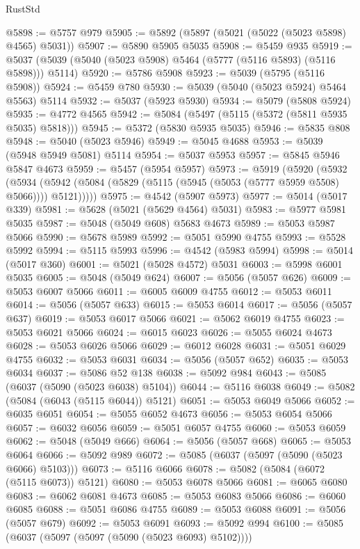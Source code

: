 \begin{lexlean}{RustStd}
\begin{coremodule}
@5898 := @5757 @979
@5905 := @5892 (@5897 (@5021 (@5022 (@5023 @5898) @4565) @5031))
@5907 := @5890 @5905 @5035
@5908 := @5459 @935
@5919 := @5037 (@5039 (@5040 (@5023 @5908) @5464 (@5777 (@5116 @5893) (@5116 @5898))) @5114)
@5920 := @5786 @5908
@5923 := @5039 (@5795 (@5116 @5908))
@5924 := @5459 @780
@5930 := @5039 (@5040 (@5023 @5924) @5464 @5563) @5114
@5932 := @5037 (@5923 @5930)
@5934 := @5079 (@5808 @5924)
@5935 := @4772 @4565
@5942 := @5084 (@5497 (@5115 (@5372 (@5811 @5935 @5035) @5818)))
@5945 := @5372 (@5830 @5935 @5035)
@5946 := @5835 @808
@5948 := @5040 (@5023 @5946)
@5949 := @5045 @4688
@5953 := @5039 (@5948 @5949 @5081) @5114
@5954 := @5037 @5953
@5957 := @5845 @5946 @5847 @4673
@5959 := @5457 (@5954 @5957)
@5973 := @5919
    (@5920
      (@5932
        (@5934 (@5942 (@5084 (@5829 (@5115 (@5945 (@5053 (@5777 @5959 @5508) @5066)))) @5121)))))
@5975 := @4542 (@5907 @5973)
@5977 := @5014 (@5017 @339)
@5981 := @5628 (@5021 (@5629 @4564) @5031)
@5983 := @5977 @5981 @5035
@5987 := @5048 (@5049 @608) @5683 @4673
@5989 := @5053 @5987 @5066
@5990 := @5678 @5989
@5992 := @5051 @5990 @4755
@5993 := @5528 @5992
@5994 := @5115 @5993
@5996 := @4542 (@5983 @5994)
@5998 := @5014 (@5017 @360)
@6001 := @5021 (@5028 @4572) @5031
@6003 := @5998 @6001 @5035
@6005 := @5048 (@5049 @624)
@6007 := @5056 (@5057 @626)
@6009 := @5053 @6007 @5066
@6011 := @6005 @6009 @4755
@6012 := @5053 @6011
@6014 := @5056 (@5057 @633)
@6015 := @5053 @6014
@6017 := @5056 (@5057 @637)
@6019 := @5053 @6017 @5066
@6021 := @5062 @6019 @4755
@6023 := @5053 @6021 @5066
@6024 := @6015 @6023
@6026 := @5055 @6024 @4673
@6028 := @5053 @6026 @5066
@6029 := @6012 @6028
@6031 := @5051 @6029 @4755
@6032 := @5053 @6031
@6034 := @5056 (@5057 @652)
@6035 := @5053 @6034
@6037 := @5086 @52 @138
@6038 := @5092 @984
@6043 := @5085 (@6037 (@5090 (@5023 @6038) @5104))
@6044 := @5116 @6038
@6049 := @5082 (@5084 (@6043 (@5115 @6044)) @5121)
@6051 := @5053 @6049 @5066
@6052 := @6035 @6051
@6054 := @5055 @6052 @4673
@6056 := @5053 @6054 @5066
@6057 := @6032 @6056
@6059 := @5051 @6057 @4755
@6060 := @5053 @6059
@6062 := @5048 (@5049 @666)
@6064 := @5056 (@5057 @668)
@6065 := @5053 @6064
@6066 := @5092 @989
@6072 := @5085 (@6037 (@5097 (@5090 (@5023 @6066) @5103)))
@6073 := @5116 @6066
@6078 := @5082 (@5084 (@6072 (@5115 @6073)) @5121)
@6080 := @5053 @6078 @5066
@6081 := @6065 @6080
@6083 := @6062 @6081 @4673
@6085 := @5053 @6083 @5066
@6086 := @6060 @6085
@6088 := @5051 @6086 @4755
@6089 := @5053 @6088
@6091 := @5056 (@5057 @679)
@6092 := @5053 @6091
@6093 := @5092 @994
@6100 := @5085 (@6037 (@5097 (@5097 (@5090 (@5023 @6093) @5102))))

\end{coremodule}
\end{lexlean}
